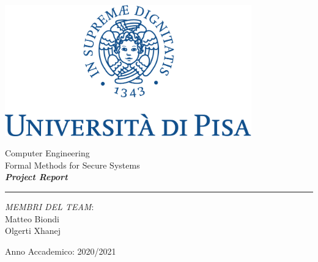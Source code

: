 \documentclass[12pt]{article}
\begin{document}
	
	
	\begin{titlepage}
		\begin{center}
			
			\begin{center}
				\includegraphics[width=0.8\textwidth]{img/marchio_unipi_pant541-eps-converted-to.pdf}         
			\end{center}
			{\Large
				\vspace{15mm}
				Computer Engineering\\
				\vspace{5mm}
				Formal Methods for Secure Systems}\\
			\vspace{30mm} 
			{\Huge\textbf{\textit{Project Report}}}\\
			\vspace{70mm} 
			\par\noindent\rule{\textwidth}{0.4pt}
			\begin{flushright}
				\textit{MEMBRI DEL TEAM}:\\
				Matteo Biondi\\
				Olgerti Xhanej\\
			\end{flushright}
			\vfill
			Anno Accademico: 2020/2021\\        
		\end{center}
	\end{titlepage} 
	\tableofcontents
	
	
		
	
	
	
\end{document}
